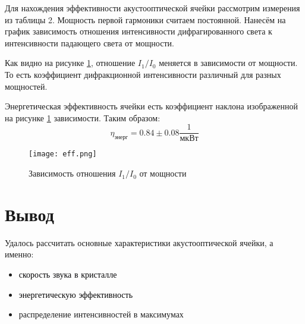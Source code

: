 \documentclass[a4paper, 12pt]{extarticle}
\begin{document}
Для нахождения эффективности акустооптической ячейки рассмотрим измерения из таблицы 2. Мощность первой гармоники считаем постоянной. 
Нанесём на график зависимость отношения интенсивности дифрагированного света к интенсивности падающего света от мощности.

Как видно на рисунке \ref{fig:eff}, отношение $I_{1} / I_{0}$ меняется в зависимости от мощности. То есть коэффициент дифракционной интенсивности различный для разных мощностей. 

Энергетическая эффективность ячейки есть коэффициент наклона изображенной на рисунке \ref{fig:eff} зависимости. Таким образом:
$$
\eta_{\text{энерг}} = 0.84 \pm 0.08 \frac{1}{\text{мкВт}}
$$

\begin{figure}[htbp]
    \centering
    \texttt{[image: eff.png]}
    \caption{Зависимость отношения $I_{1} / I_0$ от мощности}
    \label{fig:eff}
\end{figure}

\section*{\textcolor{header}{Вывод}}
Удалось рассчитать основные характеристики акустооптической ячейки, а именно:
\begin{itemize}
    \item \textcolor{2}{скорость звука в кристалле}\\
    \item \textcolor{1}{энергетическую эффективность}\\
    \item \textcolor{sub_header}{распределение интенсивностей в максимумах}
\end{itemize}
\end{document}
